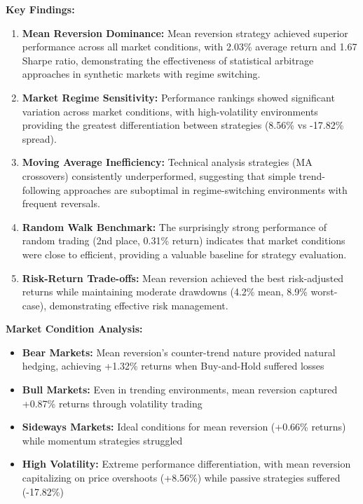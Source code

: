 \documentclass[11pt,a4paper]{article}
\begin{document}
\textbf{Key Findings:}

\begin{enumerate}
\item \textbf{Mean Reversion Dominance:} Mean reversion strategy achieved superior performance across all market conditions, with 2.03\% average return and 1.67 Sharpe ratio, demonstrating the effectiveness of statistical arbitrage approaches in synthetic markets with regime switching.

\item \textbf{Market Regime Sensitivity:} Performance rankings showed significant variation across market conditions, with high-volatility environments providing the greatest differentiation between strategies (8.56\% vs -17.82\% spread).

\item \textbf{Moving Average Inefficiency:} Technical analysis strategies (MA crossovers) consistently underperformed, suggesting that simple trend-following approaches are suboptimal in regime-switching environments with frequent reversals.

\item \textbf{Random Walk Benchmark:} The surprisingly strong performance of random trading (2nd place, 0.31\% return) indicates that market conditions were close to efficient, providing a valuable baseline for strategy evaluation.

\item \textbf{Risk-Return Trade-offs:} Mean reversion achieved the best risk-adjusted returns while maintaining moderate drawdowns (4.2\% mean, 8.9\% worst-case), demonstrating effective risk management.

\end{enumerate}
\textbf{Market Condition Analysis:}
\begin{itemize}
\item \textbf{Bear Markets:} Mean reversion's counter-trend nature provided natural hedging, achieving +1.32\% returns when Buy-and-Hold suffered losses
\item \textbf{Bull Markets:} Even in trending environments, mean reversion captured +0.87\% returns through volatility trading
\item \textbf{Sideways Markets:} Ideal conditions for mean reversion (+0.66\% returns) while momentum strategies struggled
\item \textbf{High Volatility:} Extreme performance differentiation, with mean reversion capitalizing on price overshoots (+8.56\%) while passive strategies suffered (-17.82\%)

\end{itemize}
\end{document}
